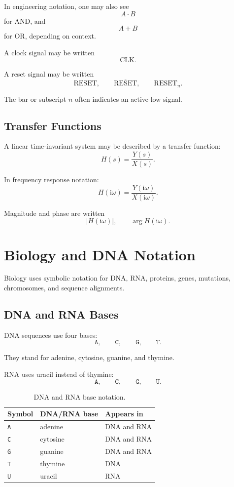 \documentclass[11pt,twocolumn]{article}
\newcommand{\abs}[1]{\left\lvert #1 \right\rvert}
\newcommand{\ii}{\mathrm{i}}
\begin{document}
In engineering notation, one may also see
\[
A \cdot B
\]
for AND, and
\[
A+B
\]
for OR, depending on context.

A clock signal may be written
\[
\mathrm{CLK}.
\]

A reset signal may be written
\[
\mathrm{RESET},
\qquad
\overline{\mathrm{RESET}},
\qquad
\mathrm{RESET}_n.
\]

The bar or subscript \(n\) often indicates an active-low signal.

\subsection{Transfer Functions}

A linear time-invariant system may be described by a transfer function:
\[
H(s)
=
\frac{Y(s)}{X(s)}.
\]

In frequency response notation:
\[
H(\ii\omega)
=
\frac{Y(\ii\omega)}{X(\ii\omega)}.
\]

Magnitude and phase are written
\[
\abs{H(\ii\omega)},
\qquad
\arg H(\ii\omega).
\]

\section{Biology and DNA Notation}

Biology uses symbolic notation for DNA, RNA, proteins, genes, mutations,
chromosomes, and sequence alignments.

\subsection{DNA and RNA Bases}

DNA sequences use four bases:
\[
\texttt{A},
\qquad
\texttt{C},
\qquad
\texttt{G},
\qquad
\texttt{T}.
\]

They stand for adenine, cytosine, guanine, and thymine.

RNA uses uracil instead of thymine:
\[
\texttt{A},
\qquad
\texttt{C},
\qquad
\texttt{G},
\qquad
\texttt{U}.
\]

\begin{table}[ht]
\centering
\small
\caption{DNA and RNA base notation.}
\begin{tabular}{lll}
\toprule
Symbol & DNA/RNA base & Appears in \\
\midrule
\texttt{A} & adenine & DNA and RNA \\
\texttt{C} & cytosine & DNA and RNA \\
\texttt{G} & guanine & DNA and RNA \\
\texttt{T} & thymine & DNA \\
\texttt{U} & uracil & RNA \\
\bottomrule
\end{tabular}
\end{table}
\end{document}
